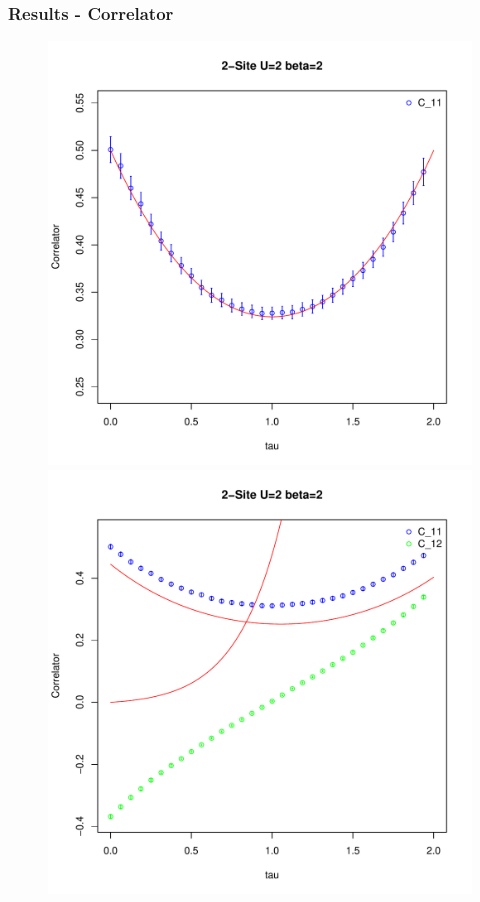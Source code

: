 \documentclass{beamer}
\begin{document}
\begin{frame}
	\frametitle{Results - Correlator}
		\begin{figure}
			\centering
			\begin{minipage}{.5\textwidth}
				\centering
				\includegraphics[width=1\linewidth]{figs/plot_C1t}
			\end{minipage}%
			\begin{minipage}{.5\textwidth}
				\centering
				\includegraphics[width=1\linewidth]{figs/plot_C2t}
			\end{minipage}
		\end{figure}
\end{frame}
\end{document}

